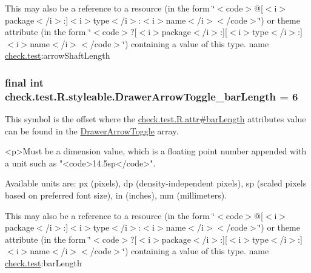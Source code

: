 This may also be a reference to a resource (in the form \char`\"{}$<$code$>$@\mbox{[}$<$i$>$package$<$/i$>$\+:\mbox{]}$<$i$>$type$<$/i$>$\+:$<$i$>$name$<$/i$>$$<$/code$>$\char`\"{}) or theme attribute (in the form \char`\"{}$<$code$>$?\mbox{[}$<$i$>$package$<$/i$>$\+:\mbox{]}\mbox{[}$<$i$>$type$<$/i$>$\+:\mbox{]}$<$i$>$name$<$/i$>$$<$/code$>$\char`\"{}) containing a value of this type.  name \hyperlink{namespacecheck_1_1test}{check.\+test}\+:arrow\+Shaft\+Length \hypertarget{classcheck_1_1test_1_1_r_1_1styleable_ad0c002a6830ad6d7027b2a71aaae6f7d}{}
\subsubsection[{Drawer\+Arrow\+Toggle\+\_\+bar\+Length}]{\setlength{\rightskip}{0pt plus 5cm}final int check.\+test.\+R.\+styleable.\+Drawer\+Arrow\+Toggle\+\_\+bar\+Length = 6\hspace{0.3cm}{\ttfamily [static]}}\label{classcheck_1_1test_1_1_r_1_1styleable_ad0c002a6830ad6d7027b2a71aaae6f7d}
This symbol is the offset where the \hyperlink{classcheck_1_1test_1_1_r_1_1attr_a8be14f238cbedd30588097110eb9dc82}{check.\+test.\+R.\+attr\#bar\+Length} attribute\textquotesingle{}s value can be found in the \hyperlink{classcheck_1_1test_1_1_r_1_1styleable_a3bd2348d01049d5d42d5b7f277abeec9}{Drawer\+Arrow\+Toggle} array.

\begin{DoxyVerb}      <p>Must be a dimension value, which is a floating point number appended with a unit such as "<code>14.5sp</code>".
\end{DoxyVerb}
 Available units are\+: px (pixels), dp (density-\/independent pixels), sp (scaled pixels based on preferred font size), in (inches), mm (millimeters). 

This may also be a reference to a resource (in the form \char`\"{}$<$code$>$@\mbox{[}$<$i$>$package$<$/i$>$\+:\mbox{]}$<$i$>$type$<$/i$>$\+:$<$i$>$name$<$/i$>$$<$/code$>$\char`\"{}) or theme attribute (in the form \char`\"{}$<$code$>$?\mbox{[}$<$i$>$package$<$/i$>$\+:\mbox{]}\mbox{[}$<$i$>$type$<$/i$>$\+:\mbox{]}$<$i$>$name$<$/i$>$$<$/code$>$\char`\"{}) containing a value of this type.  name \hyperlink{namespacecheck_1_1test}{check.\+test}\+:bar\+Length \hypertarget{classcheck_1_1test_1_1_r_1_1styleable_aab0db7b5e25645f9ddc44b92a639dfa8}{}
